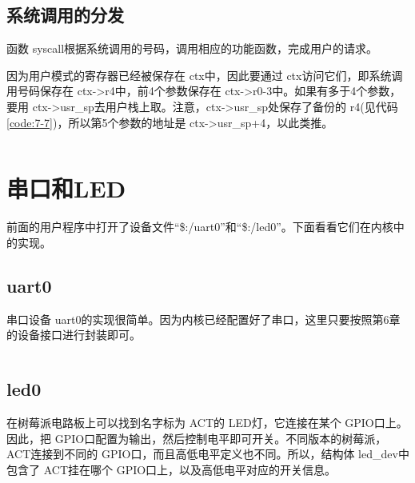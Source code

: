 \documentclass[main.tex]{subfiles}
\begin{document}
\begin{CJK*}{UTF8}{song}
\begin{code}
\label{code:7-9}
\inputminted[firstline=245,lastline=262,linenos,numbersep=5pt,frame=lines,framesep=2mm]{gas}{src/chapter07/kernel/entry.S}
\end{code}

\subsection{系统调用的分发}
函数 syscall根据系统调用的号码，调用相应的功能函数，完成用户的请求。

\par
因为用户模式的寄存器已经被保存在 ctx中，因此要通过 ctx访问它们，即系统调用号码保存在 ctx-\textgreater r4中，前4个参数保存在 ctx-\textgreater r0-3中。如果有多于4个参数，要用 ctx-\textgreater usr\_sp去用户栈上取。注意，ctx-\textgreater usr\_sp处保存了备份的 r4(见代码\ref{code:7-7})，所以第5个参数的地址是 ctx-\textgreater usr\_sp+4，以此类推。

\begin{code}
\label{code:7-10}
\inputminted[firstline=573,lastline=599,linenos,numbersep=5pt,frame=lines,framesep=2mm]{c}{src/chapter07/kernel/machdep.c}
\end{code}

\section{串口和LED}
前面的用户程序中打开了设备文件“\$:/uart0”和“\$:/led0”。下面看看它们在内核中的实现。

\subsection{uart0}
串口设备 uart0的实现很简单。因为内核已经配置好了串口，这里只要按照第6章的设备接口进行封装即可。

\begin{code}
\label{code:7-11}
\inputminted[firstline=15,lastline=72,linenos,numbersep=5pt,frame=lines,framesep=2mm]{c}{src/chapter07/kernel/uart.c}
\end{code}

\subsection{led0}
在树莓派电路板上可以找到名字标为 ACT的 LED灯，它连接在某个 GPIO口上。因此，把 GPIO口配置为输出，然后控制电平即可开关。不同版本的树莓派， ACT连接到不同的 GPIO口，而且高低电平定义也不同。所以，结构体 led\_dev中包含了 ACT挂在哪个 GPIO口上，以及高低电平对应的开关信息。


\end{CJK*}
\end{document}
